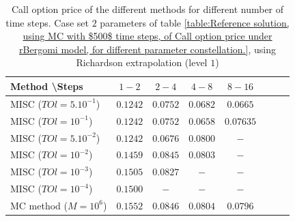 \documentclass[11pt]{article}
\begin{document}
\begin{table}[h!]
	\centering
	\begin{tabular}{l*{6}{c}r}
		Method \textbackslash  Steps    &$1-2$         & $2-4$ & $4-8$ & $8-16$\\
		\hline
		MISC ($TOl=5.10^{-1}$)  &$0.1242$ & $0.0752$ & $0.0682$ & $0.0665$ \\
		MISC ($TOl=10^{-1}$)  &$0.1242$ & $0.0752$ & $0.0658$ & $0.07635$  \\
		MISC ($TOl=5.10^{-2}$)   &$0.1242$ & $0.0676$ & $0.0800$ & $-$   \\
		MISC ($TOl=10^{-2}$)  &$0.1459$ & $0.0845$ & $0.0803$ & $-$  \\	
		MISC ($TOl=10^{-3}$)  &$0.1505$ & $0.0827$ & $-$ & $-$ \\
		MISC ($TOl=10^{-4}$)  &$0.1500$ & $-$ & $-$ & $-$ \\
		\hline
			MC method ($M=10^{6}$)   & $0.1552 $  & $0.0846 $  & $0.0804$ & $0.0796 $ \\		
		\hline
	\end{tabular}
	\caption{Call option price of the different methods for different number of time steps. Case set $2$ parameters of table \ref{table:Reference solution, using MC with $500$ time steps, of Call option price under rBergomi model, for different parameter constellation.}, using Richardson extrapolation (level $1$)}
	\label{table:  Call option price of the different methods for different number of time steps. Case set $2$ parameter, using Richardson extrapolation (level $1$)}
\end{table}
\end{document}
